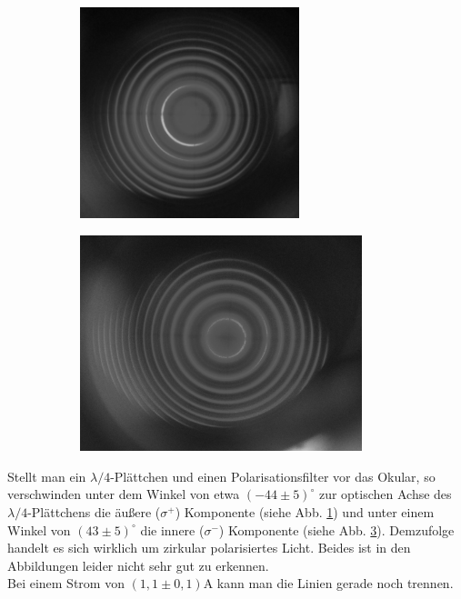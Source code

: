 \begin{figure}[h]
  \centering
  \begin{subfigure}[h]{0.5\textwidth}
    \centering
    \includegraphics[width=0.7\textwidth]{data/bilder_okular/bild_7_edit.jpg}
    \label{fig:bildlongmitBsigmaplus}
  \end{subfigure}%
  \begin{subfigure}[h]{0.5\textwidth}
    \centering
    \includegraphics[width=0.9\textwidth]{data/bilder_okular/bild_8_edit.jpg}
    \label{fig:bildlongmitBsigmaminus}
  \end{subfigure}
  \caption{}
\end{figure}

Stellt man ein $\lambda/4$-Plättchen und einen Polarisationsfilter vor das Okular, so verschwinden unter dem Winkel von etwa $(-44 \pm 5)^\circ$ zur optischen Achse des $\lambda/4$-Plättchens die äußere ($\sigma^+$) Komponente (siehe Abb. \ref{fig:bildlongmitBsigmaplus}) und unter einem Winkel von $(43 \pm 5)^\circ$ die innere ($\sigma^-$) Komponente (siehe Abb. \ref{fig:bildlongmitBsigmaminus}). Demzufolge handelt es sich wirklich um zirkular polarisiertes Licht. Beides ist in den Abbildungen leider nicht sehr gut zu erkennen.\\
Bei einem Strom von $\si{(1,1\pm 0,1)\ampere}$ kann man die Linien gerade noch trennen.
\newpage
